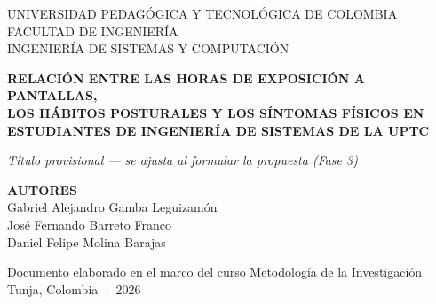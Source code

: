 \documentclass[12pt,letterpaper]{article}
\begin{document}
\begin{titlepage}
\begin{center}
\vspace*{1.5cm}
{\large UNIVERSIDAD PEDAGÓGICA Y TECNOLÓGICA DE COLOMBIA}\\[0.3cm]
{\large FACULTAD DE INGENIERÍA}\\[0.3cm]
{\large INGENIERÍA DE SISTEMAS Y COMPUTACIÓN}

\vspace{3cm}

{\Large\bfseries RELACIÓN ENTRE LAS HORAS DE EXPOSICIÓN A PANTALLAS,\\
LOS HÁBITOS POSTURALES Y LOS SÍNTOMAS FÍSICOS EN\\
ESTUDIANTES DE INGENIERÍA DE SISTEMAS DE LA UPTC}

\vspace{0.8cm}
{\itshape\small Título provisional --- se ajusta al formular la propuesta (Fase 3)}

\vspace{3cm}

{\bfseries AUTORES}\\[0.6cm]
Gabriel Alejandro Gamba Leguizamón\\
José Fernando Barreto Franco\\
Daniel Felipe Molina Barajas

\vfill

Documento elaborado en el marco del curso Metodología de la Investigación\\[0.3cm]
Tunja, Colombia · 2026

\end{center}
\end{titlepage}

\end{document}
